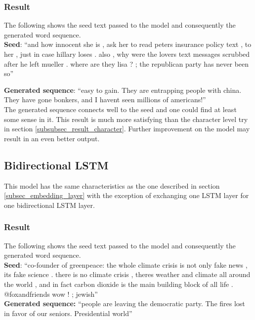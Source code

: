\documentclass[conference]{IEEEtran}
\begin{document}
\subsubsection{Result}

The following shows the seed text passed to the model and consequently the generated word sequence.\\

\textbf{Seed}: ``and how innocent she is , ask her to read peters insurance policy text , to her , just in case hillary loses . also , why were the lovers text messages scrubbed after he left mueller . where are they lisa ? ; the republican party has never been so''

\textbf{Generated sequence}: ``easy to gain. They are entrapping people with china. They have gone bonkers, and I havent seen millions of americans!''\\

The generated sequence connects well to the seed and one could find at least some sense in it. This result is much more satisfying than the character level try in section \ref{subsubsec_result_character}. Further improvement on the model may result in an even better output.

\subsection{Bidirectional LSTM}

This model has the same characteristics as the one described in section \ref{subsec_embedding_layer} with the exception of exchanging one LSTM layer for one bidirectional LSTM layer.

\subsubsection{Result}

The following shows the seed text passed to the model and consequently the generated word sequence.\\

\textbf{Seed}: ``co-founder of greenpeace: the whole climate crisis is not only fake news , its fake science . there is no climate crisis , theres weather and climate all around the world , and in fact carbon dioxide is the main building block of all life . @foxandfriends wow ! ; jewish''\\

\textbf{Generated sequence:} ``people are leaving the democratic party. The fires lost in favor of our seniors. Presidential world''\\
\end{document}
